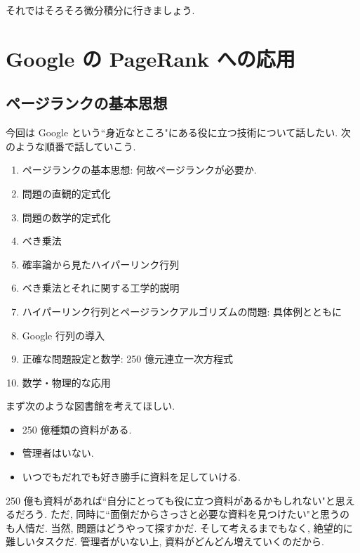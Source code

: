 \documentclass[openany, a4paper, oneside]{jsbook}
\begin{document}
それではそろそろ微分積分に行きましょう.
\chapter{Google の PageRank への応用}

\section{ページランクの基本思想}

今回は Google という``身近なところ"にある役に立つ技術について話したい.
次のような順番で話していこう.
\begin{enumerate}
\item ページランクの基本思想: 何故ページランクが必要か.
\item 問題の直観的定式化
\item 問題の数学的定式化
\item べき乗法
\item 確率論から見たハイパーリンク行列
\item ベき乗法とそれに関する工学的説明
\item ハイパーリンク行列とページランクアルゴリズムの問題: 具体例とともに
\item Google 行列の導入
\item 正確な問題設定と数学: 250 億元連立一次方程式
\item 数学・物理的な応用
\end{enumerate}

まず次のような図書館を考えてほしい.
\begin{itemize}
\item 250 億種類の資料がある.
\item 管理者はいない.
\item いつでもだれでも好き勝手に資料を足していける.
\end{itemize}
250 億も資料があれば``自分にとっても役に立つ資料があるかもしれない"と思えるだろう.
ただ, 同時に``面倒だからさっさと必要な資料を見つけたい"と思うのも人情だ.
当然, 問題はどうやって探すかだ.
そして考えるまでもなく, 絶望的に難しいタスクだ.
管理者がいない上, 資料がどんどん増えていくのだから.
\end{document}
